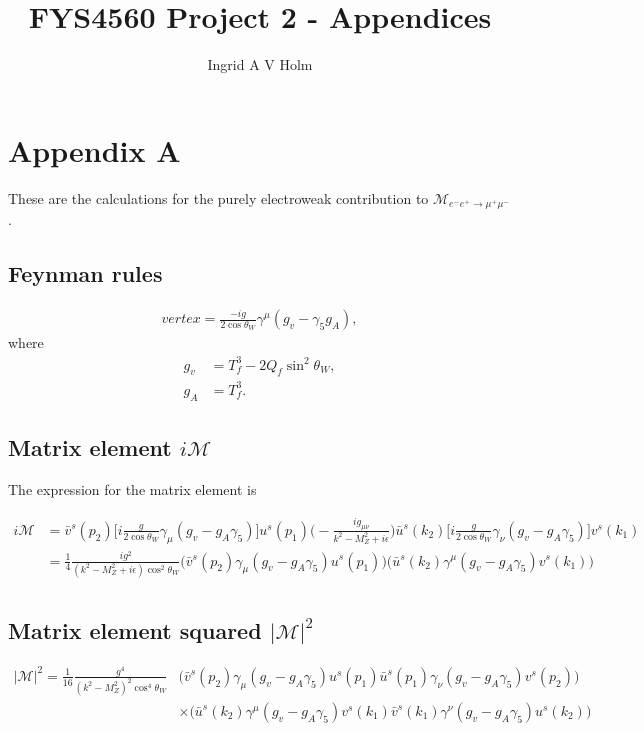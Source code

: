 \documentclass[11pt]{article}
\begin{document}
\title{FYS4560 Project 2 - Appendices}
\author{Ingrid A V Holm}
\maketitle

\section{Appendix A}
\begin{flushleft}
These are the calculations for the purely electroweak contribution to $\mathcal{M}_{e^-e^+ \rightarrow \mu^+ \mu^-}$. 
\end{flushleft}

\subsection{Feynman rules}
\begin{flushleft}
\begin{align*}
vertex= \frac{-ig}{2 \cos \theta_W} \gamma^{\mu} (g_v - \gamma_5 g_A),
\end{align*}
where
\begin{align}
g_v &=  T_f^3 - 2 Q_f \sin^2 \theta_W,\\
g_A &=  T_f^3.
\end{align}
\end{flushleft}

\subsection{Matrix element $i \mathcal{M}$}

\begin{center}
The expression for the matrix element is
\end{center}
\begin{align*}
i\mathcal{M} &= \bar{v}^s(p_2) \big[i \frac{g}{2 \cos \theta_W} \gamma_{\mu} (g_v - g_A \gamma_5)\big] u^s(p_1) \Big(- \frac{ig_{\mu \nu}}{k^2 - M_Z^2 + i \epsilon} \Big) \bar{u}^s (k_2) \big[i \frac{g}{2 \cos \theta_W} \gamma_{\nu} (g_v - g_A \gamma_5)\big] v^s (k_1)\\
&= \frac{1}{4}
\frac{i g^2}{(k^2 - M_Z^2 + i \epsilon)\cos^2 \theta_W} 
\Big( \bar{v}^s(p_2) \gamma_{\mu} (g_v - g_A \gamma_5) u^s(p_1) \Big) \Big( \bar{u}^s (k_2) \gamma^{\mu} (g_v - g_A \gamma_5) v^s (k_1)\Big)\\
\end{align*}

\subsection{Matrix element squared $|\mathcal{M}|^2$}
\begin{align*}
|\mathcal{M}|^2 = \frac{1}{16}\frac{g^4}{(k^2 - M_Z^2)^2\cos^4 \theta_W} & 
\Big( \bar{v}^s(p_2) \gamma_{\mu} (g_v - g_A \gamma_5) u^s(p_1) 
\bar{u}^s(p_1) \gamma_{\nu} (g_v - g_A \gamma_5) v^s(p_2) 
\Big)\\
& \times
\Big(
 \bar{u}^s (k_2) \gamma^{\mu} (g_v - g_A \gamma_5) v^s (k_1)
\bar{v}^s (k_1) \gamma^{\nu} (g_v - g_A \gamma_5) u^s (k_2) 
  \Big)
\end{align*}
\end{document}
